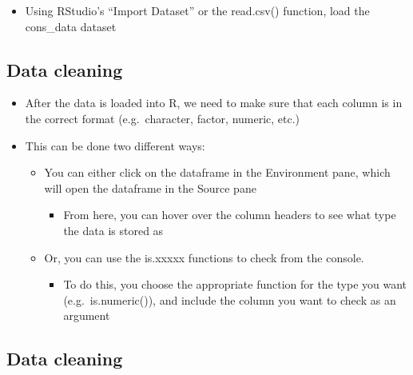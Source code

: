 \documentclass[]{article}
\newenvironment{Shaded}{\begin{snugshade}}{\end{snugshade}}
\newcommand{\KeywordTok}[1]{\textcolor[rgb]{0.13,0.29,0.53}{\textbf{#1}}}
\newcommand{\OperatorTok}[1]{\textcolor[rgb]{0.81,0.36,0.00}{\textbf{#1}}}
\newcommand{\NormalTok}[1]{#1}
\providecommand{\tightlist}{%
  \setlength{\itemsep}{0pt}\setlength{\parskip}{0pt}}
\begin{document}
\begin{itemize}
\tightlist
\item
  Using RStudio's ``Import Dataset'' or the read.csv() function, load
  the cons\_data dataset
\end{itemize}

\subsection{Data cleaning}\label{data-cleaning}

\begin{itemize}
\tightlist
\item
  After the data is loaded into R, we need to make sure that each column
  is in the correct format (e.g.~character, factor, numeric, etc.)
\item
  This can be done two different ways:

  \begin{itemize}
  \tightlist
  \item
    You can either click on the dataframe in the Environment pane, which
    will open the dataframe in the Source pane

    \begin{itemize}
    \tightlist
    \item
      From here, you can hover over the column headers to see what type
      the data is stored as
    \end{itemize}
  \item
    Or, you can use the is.xxxxx functions to check from the console.

    \begin{itemize}
    \tightlist
    \item
      To do this, you choose the appropriate function for the type you
      want (e.g.~is.numeric()), and include the column you want to check
      as an argument
    \end{itemize}
  \end{itemize}
\end{itemize}

\subsection{Data cleaning}\label{data-cleaning-1}

\begin{Shaded}
\end{Shaded}
\end{document}
